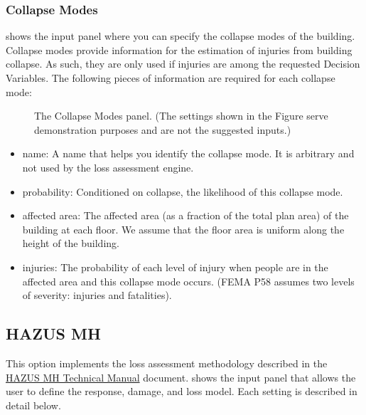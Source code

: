 \subsubsection{Collapse Modes}

 shows the input panel where you can specify the collapse modes of the building. Collapse modes provide information for the estimation of injuries from building collapse. As such, they are only used if injuries are among the requested Decision Variables. The following pieces of information are required for each collapse mode:

\begin{figure}[!htbp]
  \caption{The Collapse Modes panel. (The settings shown in the Figure serve demonstration purposes and are not the suggested inputs.)}
  \label{fig:dl_p58_collmod}
\end{figure}

\begin{itemize}
    \item name: A name that helps you identify the collapse mode. It is arbitrary and not used by the loss assessment engine.
    \item probability: Conditioned on collapse, the likelihood of this collapse mode.
    \item affected area: The affected area (as a fraction of the total plan area) of the building at each floor. We assume that the floor area is uniform along the height of the building.
    \item injuries: The probability of each level of injury when people are in the affected area and this collapse mode occurs. (FEMA P58 assumes two levels of severity: injuries and fatalities).
\end{itemize}

\subsection{HAZUS MH}

This option implements the loss assessment methodology described in the \href{https://www.fema.gov/media-library-data/20130726-1820-25045-6286/hzmh2_1_eq_tm.pdf}{HAZUS MH Technical Manual} document.  shows the input panel that allows the user to define the response, damage, and loss model. Each setting is described in detail below.

